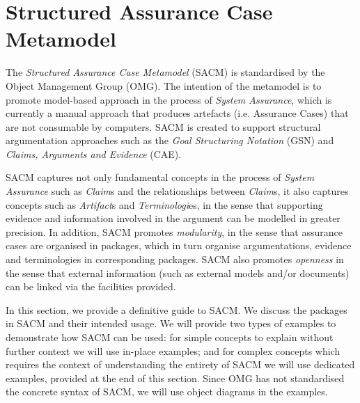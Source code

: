 \section{Structured Assurance Case Metamodel}
\label{sec:sacm}
The \textit{Structured Assurance Case Metamodel} (SACM) is standardised by the Object Management Group (OMG). The intention of the metamodel is to promote model-based approach in the process of \textit{System Assurance}, which is currently a manual approach that produces artefacts (i.e. Assurance Cases) that are not consumable by computers. SACM is created to support structural argumentation approaches such as the \textit{Goal Structuring Notation} (GSN) and \textit{Claims, Arguments and Evidence} (CAE). 

SACM captures not only fundamental concepts in the process of \textit{System Assurance} such as \textit{Claim}s and the relationships between \textit{Claim}s, it also captures concepts such as \textit{Artifact}s and \textit{Terminologi}es, in the sense that supporting evidence and information involved in the argument can be modelled in greater precision. In addition, SACM promotes \textit{modularity}, in the sense that assurance cases are organised in packages, which in turn organise argumentations, evidence and terminologies in corresponding packages. SACM also promotes \textit{openness} in the sense that external information (such as external models and/or documents) can be linked via the facilities provided. 

In this section, we provide a definitive guide to SACM. We discuss the packages in SACM and their intended usage. 
We will provide two types of examples to demonstrate how SACM can be used: for simple concepts to explain without further context we will use in-place examples; and for complex concepts which requires the context of understanding the entirety of SACM we will use dedicated examples, provided at the end of this section.
Since OMG has not standardised the concrete syntax of SACM, we will use object diagrams in the examples. 

